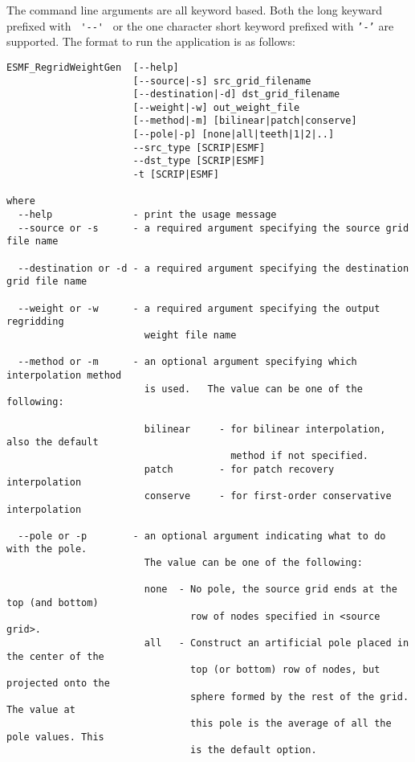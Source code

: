 The command line arguments are all keyword based.  Both the long keyward prefixed with \verb+ '--' + or the 
one character short keyword prefixed with {\tt '-'} are supported.  The format to run the application is 
as follows:

\begin{verbatim}
ESMF_RegridWeightGen  [--help]
                      [--source|-s] src_grid_filename 
                      [--destination|-d] dst_grid_filename 
                      [--weight|-w] out_weight_file 
                      [--method|-m] [bilinear|patch|conserve] 
                      [--pole|-p] [none|all|teeth|1|2|..] 
                      --src_type [SCRIP|ESMF] 
                      --dst_type [SCRIP|ESMF]
                      -t [SCRIP|ESMF]

where
  --help              - print the usage message 
  --source or -s      - a required argument specifying the source grid file name

  --destination or -d - a required argument specifying the destination grid file name

  --weight or -w      - a required argument specifying the output regridding 
                        weight file name

  --method or -m      - an optional argument specifying which interpolation method
                        is used.   The value can be one of the following:

                        bilinear     - for bilinear interpolation, also the default
                                       method if not specified.
                        patch        - for patch recovery interpolation
                        conserve     - for first-order conservative interpolation

  --pole or -p        - an optional argument indicating what to do with the pole.  
                        The value can be one of the following:

                        none  - No pole, the source grid ends at the top (and bottom) 
                                row of nodes specified in <source grid>.
                        all   - Construct an artificial pole placed in the center of the 
                                top (or bottom) row of nodes, but projected onto the 
                                sphere formed by the rest of the grid. The value at 
                                this pole is the average of all the pole values. This
                                is the default option.


\end{verbatim}
